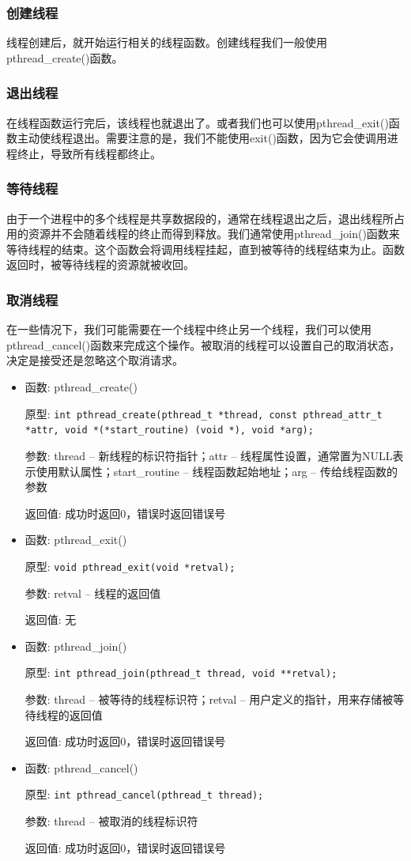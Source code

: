 \documentclass[12pt, a4paper, oneside]{ctexbook}
\numberwithin{figure}{section}
\begin{document}
\subsubsection{创建线程}
线程创建后，就开始运行相关的线程函数。创建线程我们一般使用pthread_create()函数。

\subsubsection{退出线程}
在线程函数运行完后，该线程也就退出了。或者我们也可以使用pthread_exit()函数主动使线程退出。需要注意的是，我们不能使用exit()函数，因为它会使调用进程终止，导致所有线程都终止。

\subsubsection{等待线程}
由于一个进程中的多个线程是共享数据段的，通常在线程退出之后，退出线程所占用的资源并不会随着线程的终止而得到释放。我们通常使用pthread_join()函数来等待线程的结束。这个函数会将调用线程挂起，直到被等待的线程结束为止。函数返回时，被等待线程的资源就被收回。

\subsubsection{取消线程}
在一些情况下，我们可能需要在一个线程中终止另一个线程，我们可以使用pthread_cancel()函数来完成这个操作。被取消的线程可以设置自己的取消状态，决定是接受还是忽略这个取消请求。

\begin{itemize}
    \item 函数: pthread\_create() 

    原型: \texttt{int pthread\_create(pthread\_t *thread, const pthread\_attr\_t *attr, void *(*start\_routine) (void *), void *arg);}

    参数: thread -- 新线程的标识符指针；attr -- 线程属性设置，通常置为NULL表示使用默认属性；start\_routine -- 线程函数起始地址；arg -- 传给线程函数的参数

    返回值: 成功时返回0，错误时返回错误号

    \item 函数: pthread\_exit()

    原型: \texttt{void pthread\_exit(void *retval);}

    参数: retval -- 线程的返回值

    返回值: 无

    \item 函数: pthread\_join()

    原型: \texttt{int pthread\_join(pthread\_t thread, void **retval);}

    参数: thread -- 被等待的线程标识符；retval -- 用户定义的指针，用来存储被等待线程的返回值

    返回值: 成功时返回0，错误时返回错误号

    \item 函数: pthread\_cancel()

    原型: \texttt{int pthread\_cancel(pthread\_t thread);}

    参数: thread -- 被取消的线程标识符

    返回值: 成功时返回0，错误时返回错误号
\end{itemize}
\end{document}
